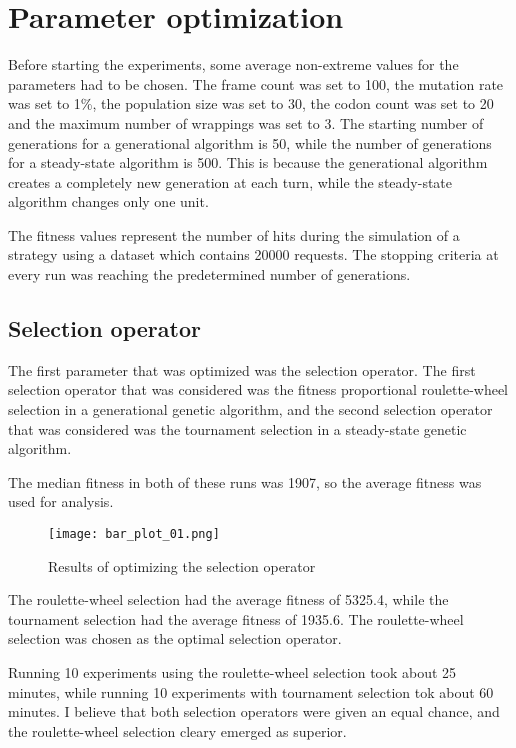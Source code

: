  \section{Parameter optimization}
Before starting the experiments, some average non-extreme values for the parameters had to be chosen. The frame count was set to 100, the mutation rate was set to 1\%, the population size was set to 30, the codon count was set to 20 and the maximum number of wrappings was set to 3. The starting number of generations for a generational algorithm is 50, while the number of generations for a steady-state algorithm is 500. This is because the generational algorithm creates a completely new generation at each turn, while the steady-state algorithm changes only one unit.

The fitness values represent the number of hits during the simulation of a strategy using a dataset which contains 20000 requests. The stopping criteria at every run was reaching the predetermined number of generations.

\subsection{Selection operator}
The first parameter that was optimized was the selection operator. The first selection operator that was considered was the fitness proportional roulette-wheel selection in a generational genetic algorithm, and the second selection operator that was considered was the tournament selection in a steady-state genetic algorithm.

The median fitness in both of these runs was 1907, so the average fitness was used for analysis.

\begin{figure}[H]
	\centering
	\texttt{[image: bar\_plot\_01.png]}
	\caption{Results of optimizing the selection operator}
\end{figure}

The roulette-wheel selection had the average fitness of 5325.4, while the tournament selection had the average fitness of 1935.6. The roulette-wheel selection was chosen as the optimal selection operator.

Running 10 experiments using the roulette-wheel selection took about 25 minutes, while running 10 experiments with tournament selection tok about 60 minutes. I believe that both selection operators were given an equal chance, and the roulette-wheel selection cleary emerged as superior.

